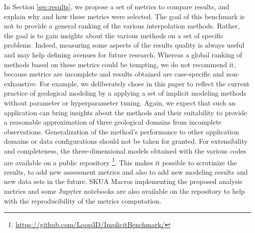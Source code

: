 \documentclass[final]{ring20}
\begin{document}
In Section \ref{sec:results}, we propose a set of metrics to compare results, and explain why and how these metrics were selected. The goal of this benchmark is not to provide a general ranking of the various interpolation methods. Rather, the goal is to gain insights about the various methods on a set of specific problems. Indeed, measuring some aspects of the results quality is always useful and may help defining avenues for future research. Whereas a global ranking of methods based on these metrics could be tempting, we do not recommend it, because metrics are incomplete and results obtained are case-specific and non-exhaustive. For example, we deliberately chose in this paper to reflect the current practice of geological modeling by a applying a set of implicit modeling methods without parameter or hyperparameter tuning. Again, we expect that such an application can bring insights about the methods and their suitability to provide a reasonable approximation of three geological domains from incomplete observations. Generalization of the method's performance to other application domains or data configurations should not be taken for granted. For extensibility and completeness, the three-dimensional models obtained with the various codes are available on a public repository \footnote{\url{https://github.com/Loop3D/ImplicitBenchmark/}}. This makes it possible to scrutinize the results, to add new assessment metrics and also to add new modeling results and new data sets in the future. SKUA Macros implementing the proposed analysis metrics and some Jupyter notebooks are also available on the repository to help with the reproducibility of the metrics computation. 

\end{document}
